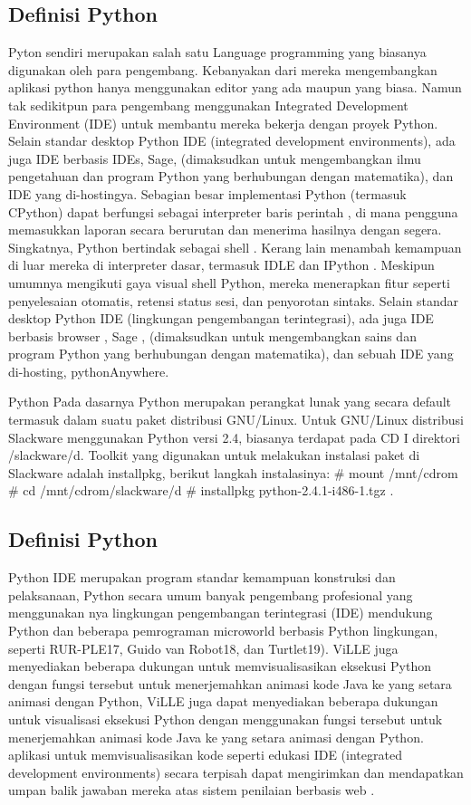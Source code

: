 \subsection{Definisi Python}
	Pyton sendiri merupakan salah satu Language programming yang biasanya digunakan oleh para pengembang. Kebanyakan dari mereka mengembangkan aplikasi python hanya menggunakan editor yang ada maupun yang biasa. Namun tak sedikitpun para pengembang menggunakan Integrated Development Environment (IDE) untuk membantu mereka bekerja dengan proyek Python. Selain standar desktop Python IDE (integrated development environments), ada juga IDE berbasis IDEs, Sage, (dimaksudkan untuk mengembangkan ilmu pengetahuan dan program Python yang berhubungan dengan matematika), dan IDE yang di-hostingya.
	Sebagian besar implementasi Python (termasuk CPython) dapat berfungsi sebagai interpreter baris perintah , di mana pengguna memasukkan laporan secara berurutan dan menerima hasilnya dengan segera. Singkatnya, Python bertindak sebagai shell . Kerang lain menambah kemampuan di luar mereka di interpreter dasar, termasuk IDLE dan IPython . Meskipun umumnya mengikuti gaya visual shell Python, mereka menerapkan fitur seperti penyelesaian otomatis, retensi status sesi, dan penyorotan sintaks.
	Selain standar desktop Python IDE (lingkungan pengembangan terintegrasi), ada juga IDE berbasis browser , Sage , (dimaksudkan untuk mengembangkan sains dan program Python yang berhubungan dengan matematika), dan sebuah IDE yang di-hosting, pythonAnywhere. \cite{van2007python}

 Python Pada dasarnya Python merupakan perangkat lunak yang secara default termasuk dalam suatu paket distribusi GNU/Linux. Untuk GNU/Linux distribusi Slackware menggunakan Python versi 2.4, biasanya terdapat pada CD I direktori /slackware/d. Toolkit yang digunakan untuk melakukan instalasi paket di Slackware adalah installpkg, berikut langkah instalasinya:
  # mount /mnt/cdrom 
  # cd /mnt/cdrom/slackware/d 
  # installpkg python-2.4.1-i486-1.tgz \cite{utamipemrograman}.

\subsection{Definisi Python}
Python IDE merupakan program standar kemampuan konstruksi dan pelaksanaan, Python secara umum banyak pengembang profesional yang menggunakan nya 
lingkungan pengembangan terintegrasi (IDE) mendukung
Python dan beberapa pemrograman microworld berbasis Python lingkungan, seperti RUR-PLE17, Guido van Robot18, dan Turtlet19). ViLLE juga menyediakan beberapa dukungan untuk memvisualisasikan eksekusi Python dengan fungsi tersebut untuk menerjemahkan animasi kode Java ke yang setara animasi dengan Python, ViLLE  juga dapat menyediakan beberapa dukungan untuk visualisasi eksekusi Python dengan menggunakan fungsi tersebut untuk menerjemahkan animasi kode Java ke yang setara animasi dengan Python. aplikasi untuk memvisualisasikan kode seperti edukasi IDE (integrated development environments) secara terpisah dapat mengirimkan dan mendapatkan umpan balik jawaban mereka atas sistem penilaian berbasis web \cite{helminen2010jype}.

